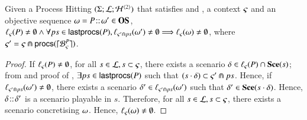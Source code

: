 \begin{theorem}
\label{thm:ordered-ua}
Given a Process Hitting $(\Sigma; \mathcal{L}; \mathcal{H}^{\langle 2 \rangle})$
that satisfies  and ,
a context $\varsigma$ and an objective sequence $\omega =
P\!::\!\omega'\in\mathbf{OS}$,
$\ell_\varsigma(P)\neq\emptyset \wedge
	\forall ps \in\mathsf{lastprocs}(P),
	\ell_{\varsigma'\Cap ps}(\omega')\neq\emptyset
	\Longrightarrow \ell_\varsigma(\omega)\neq\emptyset$,
where $\varsigma' = \varsigma\Cap\mathsf{procs}(\lceil \mathcal{B}_{\varsigma}^{P}\rceil)$.
\end{theorem}
\begin{proof}
If $\ell_\varsigma(P)\neq\emptyset$,
for all $s\in \mathcal{L}, s\subset\varsigma$,
there exists a scenario $\delta\in\ell_\varsigma(P)\cap\mathbf{Sce}(s)$;
from  and proof of ,
$\exists ps\in\mathsf{lastprocs}(P)$ such that
$(s\cdot\delta)\subset\varsigma'\Cap ps$.
Hence, if $\ell_{\varsigma'\Cap ps}(\omega')\neq\emptyset$,
there exists a scenario $\delta'\in\ell_{\varsigma'\Cap ps}(\omega')$ such that
$\delta'\in\mathbf{Sce}(s\cdot\delta)$.
Hence, $\delta\!::\!\delta'$ is a scenario playable in $s$.
Therefore, for all $s\in \mathcal{L}, s\subset\varsigma$, there exists a scenario
concretising $\omega$.
Hence, $\ell_\varsigma(\omega)\neq\emptyset$.
\end{proof}





\newcommand{\res}{\mathbf{res}}
\newcommand{\osres}{\mathbf{OSres}}
\newcommand{\autoBS}{\mathbf{autoBS}}
\newcommand{\rec}{\mathbf{rec}}
\newcommand{\thisobj}[1]{P_{#1}}
\newcommand{\thisseq}[1]{\Theta_{#1}}

